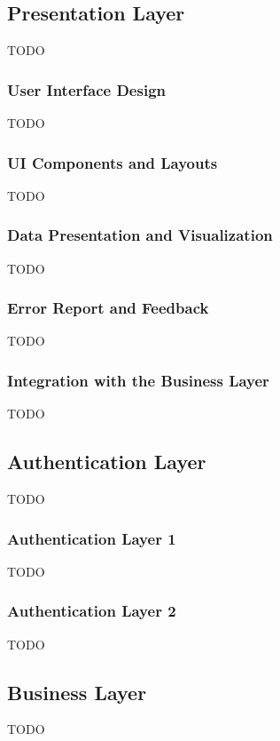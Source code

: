 \documentclass[a4paper,11pt]{article}
\begin{document}
    \vspace{0.5cm}
    \subsection{Presentation Layer}
        TODO
        
    \subsubsection{User Interface Design}
        TODO
        
    \subsubsection{UI Components and Layouts}
        TODO
        
    \subsubsection{Data Presentation and Visualization}
        TODO
        
    \subsubsection{Error Report and Feedback}
        TODO
        
    \subsubsection{Integration with the Business Layer}
        TODO

    \vspace{0.5cm}
    \subsection{Authentication Layer}
        TODO
        
    \subsubsection{Authentication Layer 1}
        TODO
        
    \subsubsection{Authentication Layer 2}
        TODO
        
    \vspace{0.5cm}
    \subsection{Business Layer}
        TODO
\end{document}
